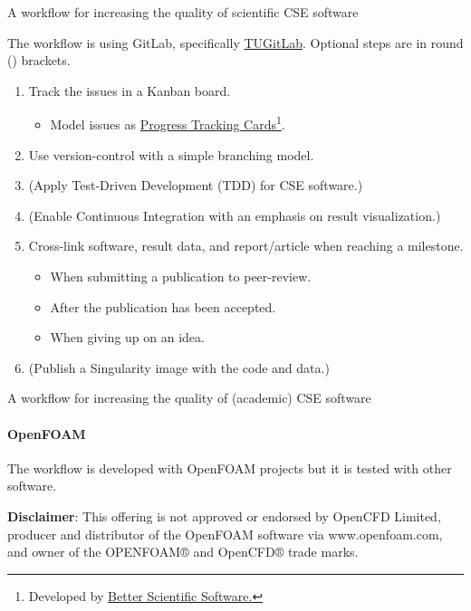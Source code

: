 \documentclass[
	aspectratio=169,%
	color={accentcolor=2d},
	logo=true,%
	colorframetitle=true,%
	]{tudabeamer}
\begin{document}
\begin{frame}{A workflow for increasing the quality of scientific CSE software} 

    \vfill
    The workflow is using GitLab, specifically \href{https://git.rwth-aachen.de/}{TUGitLab}. 
    Optional steps are in round () brackets.
    \begin{enumerate}
        \item Track the issues in a Kanban board. 
            \begin{itemize}
                \item Model issues as \href{https://betterscientificsoftware.github.io/PSIP-Tools/PTCs/}{Progress Tracking Cards}\footnote{Developed by \href{https://bssw.io/}{Better Scientific Software.}}.
            \end{itemize}
        \item Use version-control with a simple branching model. 
        \item (Apply Test-Driven Development (TDD) for CSE software.)
        \item (Enable Continuous Integration with an emphasis on result visualization.) 
        \item Cross-link software, result data, and report/article when reaching a milestone.
            \begin{itemize}
                \item When submitting a publication to peer-review. 
                \item After the publication has been accepted. 
                \item When giving up on an idea. 
            \end{itemize}
        \item (Publish a Singularity image with the code and data.)
    \end{enumerate}
\end{frame}

\begin{frame}{A workflow for increasing the quality of (academic) CSE software} 
    \framesubtitle{OpenFOAM}

        \vfill

        The workflow is developed with OpenFOAM projects but it is tested with other software. 

        \vspace{1cm}

        \textbf{Disclaimer}: This offering is not approved or endorsed by OpenCFD Limited, producer and distributor of the OpenFOAM software via www.openfoam.com, and owner of the OPENFOAM®  and OpenCFD®  trade marks. 

\end{frame}
\end{document}

